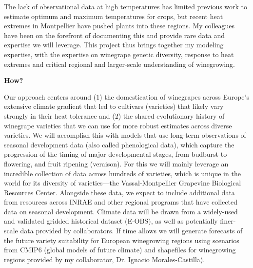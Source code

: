 \documentclass[11pt,letter,oneside]{article}
\begin{document}
The lack of observational data at high temperatures has limited previous work to estimate optimum and maximum temperatures for crops, but recent heat extremes in Montpellier have pushed plants into these regions. My colleagues have been on the forefront of documenting this\cite{coupel2024clusters} and provide rare data and expertise we will leverage.  %
This project thus brings together my modeling expertise, with the expertise on winegrape genetic diversity, response to heat extremes and critical regional and larger-scale understanding of winegrowing. %

{\bf How? }

Our approach centers around (1) the domestication of winegrapes across Europe's extensive climate gradient that led to cultivars (varieties) that likely vary strongly in their heat tolerance and (2) the shared evolutionary history of winegrape varieties that we can use for more robust estimates across diverse varieties. We will accomplish this with models that use long-term observations of seasonal development data (also called phenological data), which capture the progression of the timing of major developmental stages, from budburst to flowering, and fruit ripening (veraison). For this we will mainly leverage an incredible collection of data across hundreds of varieties, which is unique in the world for its diversity of varieties---the Vassal-Montpellier Grapevine Biological Resources Center. Alongside these data, we expect to include additional data from resources across INRAE and other regional programs that have collected data on seasonal development. Climate data will be drawn from a widely-used and validated gridded historical dataset (E-OBS),\cite{cornes2018ensemble} as well as potentially finer-scale data provided by collaborators. If time allows we will generate forecasts of the future variety suitability for European winegrowing regions using scenarios from CMIP6 (global models of future climate)\cite{eyring2016,riahiSSP2017,cookcmip} and shapefiles for winegrowing regions provided by my collaborator, Dr. Ignacio Morales-Castilla).
\end{document}
